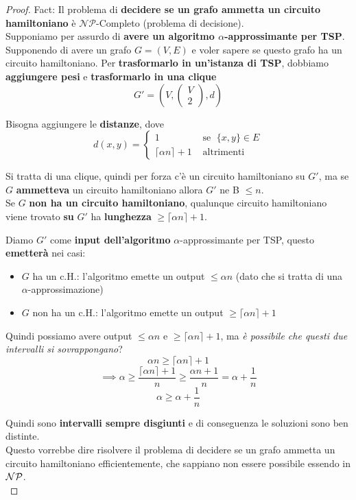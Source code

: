 \documentclass[11pt]{article}
\begin{document}
	\begin{proof}
		Fact: Il problema di \textbf{decidere se un grafo ammetta un circuito hamiltoniano} è $\mathcal{NP}$-Completo (problema di decisione).\\
		
		Supponiamo per assurdo di \textbf{avere un algoritmo $\alpha$-approssimante per TSP}. \\
		
		Supponendo di avere un grafo $G=(V,E)$ e voler sapere se questo grafo ha un circuito hamiltoniano. Per \textbf{trasformarlo in un'istanza di TSP}, dobbiamo \textbf{aggiungere pesi} e \textbf{trasformarlo in una clique}
		$$ G' = \left(V, \left(
		\begin{array}{c}
			V\\
			2
		\end{array}
		\right), d \right)$$
		
		Bisogna aggiungere le \textbf{distanze}, dove
		$$ 
		d(x,y) = \begin{cases}
			1 & \text{ se } \; \{x,y\} \in E \\
			\lceil \alpha n \rceil + 1 & \text{ altrimenti}
		\end{cases}
		$$
		
		Si tratta di una clique, quindi per forza c'è un circuito hamiltoniano su $G'$, ma se $G$ \textbf{ammetteva} un circuito hamiltoniano allora $G'$ ne B $\leq n$.\\
		Se $G$ \textbf{non ha un circuito hamiltoniano}, qualunque circuito hamiltoniano viene trovato \textbf{su} $G'$ ha \textbf{lunghezza} $\geq \lceil \alpha n\rceil + 1$.\\
		
		\newpage
		
		Diamo $G'$ come \textbf{input dell'algoritmo} $\alpha$-approssimante per TSP, questo \textbf{emetterà} nei casi:
		\begin{itemize}
			\item $G$ ha un c.H.: l'algoritmo emette un output $\leq \alpha n$ (dato che si tratta di una $\alpha$-approssimazione)
			\item $G$ non ha un c.H.: l'algoritmo emette un output $\geq \lceil \alpha n \rceil + 1$
		\end{itemize}
		
		Quindi possiamo avere output $\leq \alpha n$ e  $\geq \lceil \alpha n \rceil + 1$, ma \textit{è possibile che questi due intervalli si sovrappongano}?
		$$ \alpha n \geq \lceil \alpha n \rceil + 1 $$
		$$ \implies \alpha \geq \frac{\lceil \alpha n \rceil + 1}{n} \geq \frac{\alpha n + 1}{n} = \alpha + \frac{1}{n}$$
		$$ \alpha \geq \alpha + \frac{1}{n}$$
		
		Quindi sono \textbf{intervalli sempre disgiunti} e di conseguenza le soluzioni sono ben distinte.\\
		
		Questo vorrebbe dire risolvere il problema di decidere se un grafo ammetta un circuito hamiltoniano efficientemente, che sappiano non essere possibile essendo in $\mathcal{NP}$.\\
	\end{proof}
	
\end{document}

